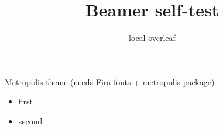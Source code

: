 \documentclass{beamer}
\title{Beamer self-test}\author{local overleaf}
\begin{document}
\maketitle
\begin{frame}{Metropolis theme (needs Fira fonts + metropolis package)}
\begin{itemize}\item<1-> first \item<2-> second\end{itemize}
\end{frame}
\end{document}
